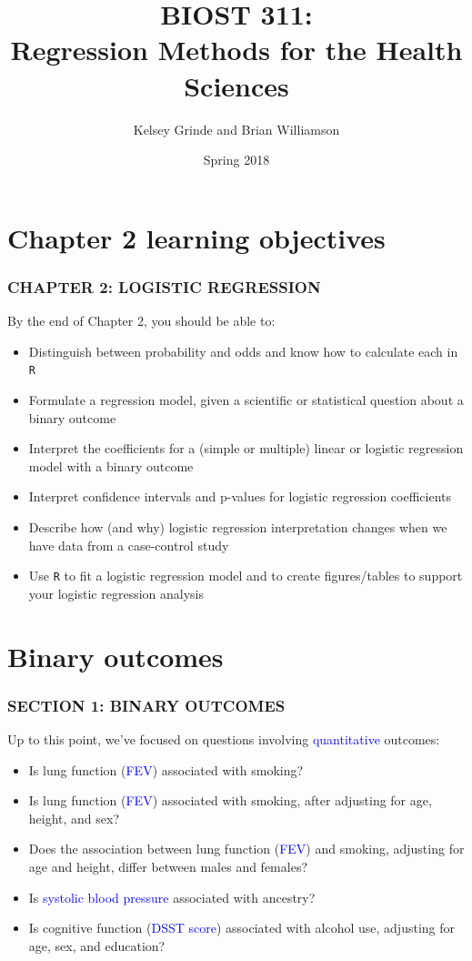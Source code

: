 \documentclass[12pt, 
hyperref={colorlinks=true, linkcolor=blue, urlcolor=cyan}]{beamer}
\title{BIOST 311: \\ Regression Methods for the Health Sciences}
\author{Kelsey Grinde and Brian Williamson}
\institute{UW Biostatistics}
\date{Spring 2018}
\begin{document}
\begin{frame}
\titlepage\thispagestyle{empty}
\end{frame}

  
\setcounter{framenumber}{\value{chap1}}

\section{Chapter 2 learning objectives}
\begin{frame}
\frametitle{CHAPTER 2: LOGISTIC REGRESSION}

By the end of Chapter 2, you should be able to:
\begin{itemize}
\item Distinguish between probability and odds and know how to calculate each in \texttt{R}
\item Formulate a regression model, given a scientific or statistical question about a binary outcome
\item Interpret the coefficients for a (simple or multiple) linear or logistic regression model with a binary outcome
\item Interpret confidence intervals and p-values for logistic regression coefficients
\item Describe how (and why) logistic regression interpretation changes when we have data from a case-control study
\item Use \texttt{R} to fit a logistic regression model  and to create figures/tables to support your logistic regression analysis
\end{itemize}
\end{frame}

\section{Binary outcomes}
\begin{frame}
\frametitle{SECTION 1: BINARY OUTCOMES}
Up to this point, we've focused on questions involving \textcolor{blue}{quantitative} outcomes:

\begin{itemize}
\item Is lung function (\textcolor{blue}{FEV}) associated with smoking?
\item Is lung function (\textcolor{blue}{FEV}) associated with smoking, after adjusting for age, height, and sex?
\item Does the association between lung function (\textcolor{blue}{FEV}) and smoking, adjusting for age and height, differ between males and females?
\item Is \textcolor{blue}{systolic blood pressure} associated with ancestry?
\item Is cognitive function (\textcolor{blue}{DSST score}) associated with alcohol use, adjusting for age, sex, and education?
\end{itemize}
\end{frame}
\end{document}
